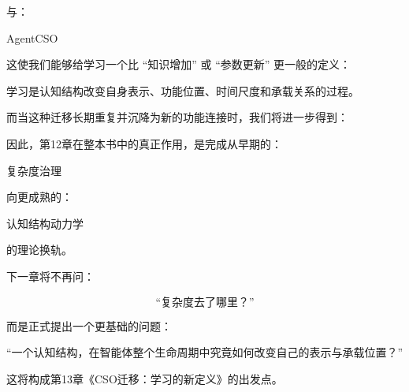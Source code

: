 与：

\begin{statementbox}
AgentCSO
\end{statementbox}

这使我们能够给学习一个比 ``知识增加'' 或 ``参数更新'' 更一般的定义：

\begin{definition*}
学习是认知结构改变自身表示、功能位置、时间尺度和承载关系的过程。
\end{definition*}

而当这种迁移长期重复并沉降为新的功能连接时，我们将进一步得到：

\begin{statementbox}
\centering
{}
\end{statementbox}

因此，第12章在整本书中的真正作用，是完成从早期的：

\begin{statementbox}
复杂度治理
\end{statementbox}

向更成熟的：

\begin{statementbox}
认知结构动力学
\end{statementbox}

的理论换轨。

下一章将不再问：

\[
\text{``复杂度去了哪里？''}
\]

而是正式提出一个更基础的问题：

\begin{statementbox}
``一个认知结构，在智能体整个生命周期中究竟如何改变自己的表示与承载位置？''
\end{statementbox}

这将构成第13章《CSO迁移：学习的新定义》的出发点。
